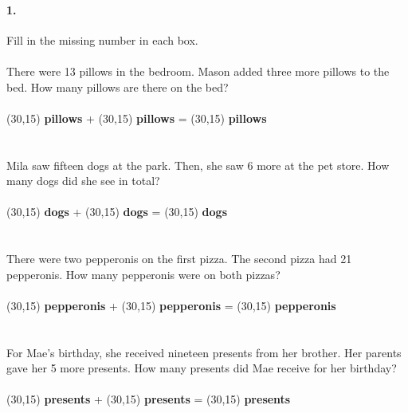 \documentclass[12pt]{article}
\begin{document}
\paragraph{1.}
Fill in the missing number in each box. \\
\\
There were 13 pillows in the bedroom. Mason added three more pillows to the bed. How many pillows are there on the bed?
\\
\\
\framebox(30,15){} \textbf{pillows} + \framebox(30,15){} \textbf{pillows} = \framebox(30,15){} \textbf{pillows}
\\
\\
\\
Mila saw fifteen dogs at the park. Then, she saw 6 more at the pet store. How many dogs did she see in total?
\\
\\
\framebox(30,15){} \textbf{dogs} + \framebox(30,15){} \textbf{dogs} = \framebox(30,15){} \textbf{dogs}
\\
\\
\\
There were two pepperonis on the first pizza. The second pizza had 21 pepperonis. How many pepperonis were on both pizzas?
\\
\\
\framebox(30,15){} \textbf{pepperonis} + \framebox(30,15){} \textbf{pepperonis} = \framebox(30,15){} \textbf{pepperonis}
\\
\\
\\
For Mae's birthday, she received nineteen presents from her brother. Her parents gave her 5 more presents. How many presents did Mae receive for her birthday?
\\
\\
\framebox(30,15){} \textbf{presents} + \framebox(30,15){} \textbf{presents} = \framebox(30,15){} \textbf{presents}

\newpage
\end{document}
